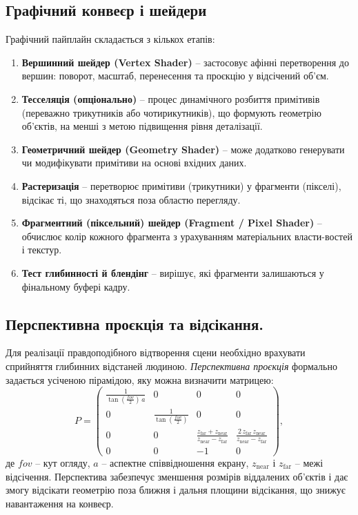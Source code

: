 \subsection*{Графічний конвеєр і шейдери}
Графічний пайплайн складається з кількох етапів:
\begin{enumerate}
    \item \textbf{Вершинний шейдер (Vertex Shader)} -- застосовує афінні пе\-рет\-во\-рен\-ня до вершин: поворот, масштаб, перенесення та проєкцію у відсічений об’єм.
    \item \textbf{Тесселяція (опціонально)} -- процес динамічного розбиття примітивів (переважно трикутників або чотирикутників), що формують геометрію об'єктів, на менші  з метою підвищення рівня деталізації. 
      
    \item \textbf{Геометричний шейдер (Geometry Shader)} -- може додатково генерувати чи модифікувати примітиви на основі вхідних даних.
    \item \textbf{Растеризація} -- перетворює примітиви (трикутники) у фрагменти (пік\-се\-лі), відсікає ті, що знаходяться поза областю перегляду.
    \item \textbf{Фрагментний (піксельний) шейдер (Fragment / Pixel Shader)} -- обчислює колір кожного фрагмента з урахуванням матеріальних влас\-ти-\-вос\-тей і текстур.
    \item \textbf{Тест глибинності й блендінг} -- вирішує, які фрагменти за\-ли\-шаю\-ть\-ся у фінальному буфері кадру.
\end{enumerate}

\subsection*{Перспективна проєкція та відсікання.}
Для реалізації правдоподібного відтворення сцени необхідно врахувати сприйняття глибинних відстаней людиною. \textit{Перспективна проєкція} формально задається усіченою пірамідою, яку можна визначити матрицею:
\[
P = 
\begin{pmatrix}
\frac{1}{\tan(\tfrac{fov}{2})\,a} & 0 & 0 & 0 \\
0 & \frac{1}{\tan(\tfrac{fov}{2})} & 0 & 0 \\
0 & 0 & \frac{z_\mathrm{far}+z_\mathrm{near}}{z_\mathrm{near}-z_\mathrm{far}} & \frac{2\,z_\mathrm{far}\,z_\mathrm{near}}{z_\mathrm{near}-z_\mathrm{far}} \\
0 & 0 & -1 & 0
\end{pmatrix},
\]
де $fov$ -- кут огляду, $a$ -- аспектне співвідношення екрану, $z_\mathrm{near}$ і $z_\mathrm{far}$ -- межі відсічення. Перспектива забезпечує зменшення розмірів 
віддалених об’єктів і дає змогу відсікати геометрію поза ближня і дальня площини відсікання, що знижує навантаження на конвеєр.

